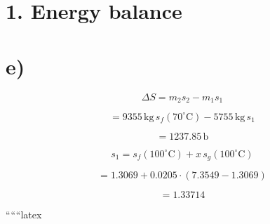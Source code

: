 \section*{1. Energy balance}



\section*{e)}

\[
\Delta S = m_2 s_2 - m_1 s_1
\]

\[
= 9355 \, \text{kg} \, s_f (70^\circ \text{C}) - 5755 \, \text{kg} \, s_1
\]

\[
= 1237.85 \, \text{b}
\]

\[
s_1 = s_f (100^\circ \text{C}) + x \, s_g (100^\circ \text{C})
\]

\[
= 1.3069 + 0.0205 \cdot (7.3549 - 1.3069)
\]

\[
= 1.33714
\]

``````latex